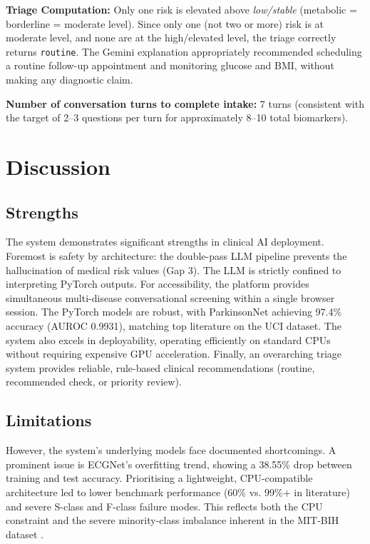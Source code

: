 \textbf{Triage Computation:} Only one risk is elevated above \textit{low/stable} (metabolic = borderline = moderate level). Since only one (not two or more) risk is at moderate level, and none are at the high/elevated level, the triage correctly returns \texttt{routine}. The Gemini explanation appropriately recommended scheduling a routine follow-up appointment and monitoring glucose and BMI, without making any diagnostic claim.

\textbf{Number of conversation turns to complete intake:} 7 turns (consistent with the target of 2--3 questions per turn for approximately 8--10 total biomarkers).

\section{Discussion}

\subsection{Strengths}

The system demonstrates significant strengths in clinical AI deployment. Foremost is safety by architecture: the double-pass LLM pipeline prevents the hallucination of medical risk values (Gap 3). The LLM is strictly confined to interpreting PyTorch outputs. For accessibility, the platform provides simultaneous multi-disease conversational screening within a single browser session. The PyTorch models are robust, with ParkinsonNet achieving 97.4\% accuracy (AUROC 0.9931), matching top literature on the UCI dataset. The system also excels in deployability, operating efficiently on standard CPUs without requiring expensive GPU acceleration. Finally, an overarching triage system provides reliable, rule-based clinical recommendations (routine, recommended check, or priority review).

\subsection{Limitations}

However, the system's underlying models face documented shortcomings. A prominent issue is ECGNet's overfitting trend, showing a 38.55\% drop between training and test accuracy. Prioritising a lightweight, CPU-compatible architecture led to lower benchmark performance (60\% vs. 99\%+ in literature) and severe S-class and F-class failure modes. This reflects both the CPU constraint and the severe minority-class imbalance inherent in the MIT-BIH dataset \cite{ayyub2025, kerdoudi2024}. 


